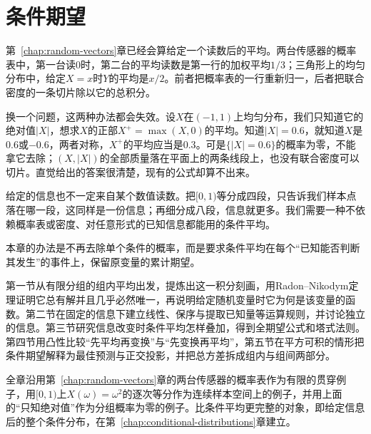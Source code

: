 \chapter{条件期望}
\label{chap:conditional-expectation}

第~\ref{chap:random-vectors}章已经会算给定一个读数后的平均。两台传感器的概率表中，第一台读$0$时，第二台的平均读数是第一行的加权平均$1/3$；三角形上的均匀分布中，给定$X=x$时$Y$的平均是$x/2$。前者把概率表的一行重新归一，后者把联合密度的一条切片除以它的总积分。

换一个问题，这两种办法都会失效。设$X$在$(-1,1)$上均匀分布，我们只知道它的绝对值$\lvert X\rvert$，想求$X$的正部$X^{+}=\max(X,0)$的平均。知道$\lvert X\rvert=0.6$，就知道$X$是$0.6$或$-0.6$，两者对称，$X^{+}$的平均应当是$0.3$。可是$\{\lvert X\rvert=0.6\}$的概率为零，不能拿它去除；$(X,\lvert X\rvert)$的全部质量落在平面上的两条线段上，也没有联合密度可以切片。直觉给出的答案很清楚，现有的公式却算不出来。

给定的信息也不一定来自某个数值读数。把$[0,1)$等分成四段，只告诉我们样本点落在哪一段，这同样是一份信息；再细分成八段，信息就更多。我们需要一种不依赖概率表或密度、对任意形式的已知信息都能用的条件平均。

本章的办法是不再去除单个条件的概率，而是要求条件平均在每个“已知能否判断其发生”的事件上，保留原变量的累计期望。

第一节从有限分组的组内平均出发，提炼出这一积分刻画，用Radon--Nikodym定理证明它总有解并且几乎必然唯一，再说明给定随机变量时它为何是该变量的函数。第二节在固定的信息下建立线性、保序与提取已知量等运算规则，并讨论独立的信息。第三节研究信息改变时条件平均怎样叠加，得到全期望公式和塔式法则。第四节用凸性比较“先平均再变换”与“先变换再平均”，第五节在平方可积的情形把条件期望解释为最佳预测与正交投影，并把总方差拆成组内与组间两部分。

全章沿用第~\ref{chap:random-vectors}章的两台传感器的概率表作为有限的贯穿例子，用$[0,1)$上$X(\omega)=\omega^{2}$的逐次等分作为连续样本空间上的例子，并用上面的“只知绝对值”作为分组概率为零的例子。比条件平均更完整的对象，即给定信息后的整个条件分布，在第~\ref{chap:conditional-distributions}章建立。












